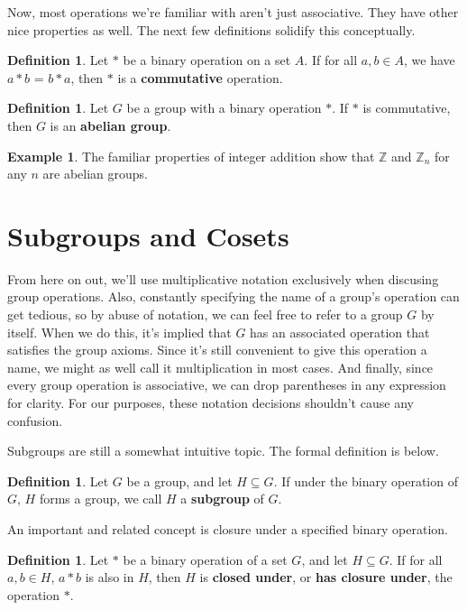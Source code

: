 \documentclass[12pt]{article}
\newcommand{\z}{\mathbb{Z}}
\newcommand{\zn}[1][]{\mathbb{Z}_{#1}}
\newcommand{\extra}{\marginpar{$*$}}
\theoremstyle{definition}
\theoremstyle{definition}
\newtheorem{definition}[theorem]{Definition}
\theoremstyle{definition}
\newtheorem{example}[theorem]{Example}
\theoremstyle{definition}
\begin{document}
Now, most operations we're familiar with aren't just associative. They have other nice properties as well. The next few definitions solidify this conceptually.

\begin{definition}
Let $*$ be a binary operation on a set $A$. \extra If for all $a, b \in A$, we have $a * b$ = $b * a$, then $*$ is a \textbf{commutative} operation.
\end{definition}

\begin{definition}
Let $G$ be a group with a binary operation $*$. \extra If $*$ is commutative, then $G$ is an \textbf{abelian group}.
\end{definition}

\begin{example}
The familiar properties of integer addition show that $\z$ and $\zn[n]$ for any $n$ are abelian groups.
\end{example}

\section{Subgroups and Cosets}

From here on out, we'll use multiplicative notation exclusively when discusing group operations. Also, constantly specifying the name of a group's operation can get tedious, so by abuse of notation, we can feel free to refer to a group $G$ by itself. When we do this, it's implied that $G$ has an associated operation that satisfies the group axioms. Since it's still convenient to give this operation a name, we might as well call it multiplication in most cases. And finally, since every group operation is associative, we can drop parentheses in any expression for clarity. For our purposes, these notation decisions shouldn't cause any confusion.

Subgroups are still a somewhat intuitive topic. The formal definition is below.

\begin{definition}
Let $G$ be a group, and let $H \subseteq G$. If under the binary operation of $G$, $H$ forms a group, we call $H$ a \textbf{subgroup} of $G$.
\end{definition}

An important and related concept is closure under a specified binary operation.

\begin{definition}
Let $*$ be a binary operation of a set $G$, and let $H \subseteq G$. If for all $a, b \in H$, $a*b$ is also in $H$, then $H$ is \textbf{closed under}, or \textbf{has closure under}, the operation $*$.
\end{definition}
\end{document}
